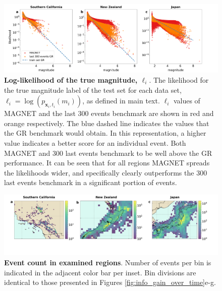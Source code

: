 \documentclass[pdflatex]{sn-jnl}
\begin{document}
\newpage
\begin{figure}[h!]
    \centering
    \includegraphics[width=1\textwidth]{figures/likelihood_scatter.png}
    \caption{
    \textbf{Log-likelihood of the true magnitude, $\ell_i$}. The likelihood for the true magnitude label of the test set for each data set, $\ell_i=\log\left(p_{\textbf{x}_i, t_i}(m_i)\right)$, as defined in main text. $\ell_i$ values of MAGNET and the last 300 events benchmark are shown in red and orange respectively. The blue dashed line indicates the values that the GR benchmark would obtain. In this representation, a higher value indicates a better score for an individual event. Both MAGNET and 300 last events benchmark to be well above the GR performance. It can be seen that for all regions MAGNET spreads the likelihoods wider, and specifically clearly outperforms the 300 last events benchmark in a significant portion of events. 
    }
    \label{fig:labels_likelihood}
\end{figure}


\newpage
\begin{figure}[h!]
    \centering
    \includegraphics[width=1\textwidth]{figures/seismicity_maps.pdf}
    \caption{
    \textbf{Event count in examined regions}. Number of events per bin is indicated in the adjacent color bar per inset. Bin divisions are identical to those presented in Figures \ref{fig:info_gain_over_time}e-g.
    }
    \label{fig:seismicity_grid}
\end{figure}
\end{document}
